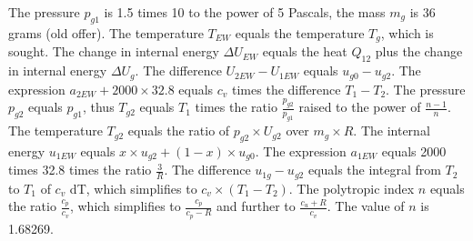 The pressure \( p_{g1} \) is 1.5 times 10 to the power of 5 Pascals, the mass \( m_g \) is 36 grams (old offer).
The temperature \( T_{EW} \) equals the temperature \( T_g \), which is sought.
The change in internal energy \( \Delta U_{EW} \) equals the heat \( Q_{12} \) plus the change in internal energy \( \Delta U_g \).
The difference \( U_{2EW} - U_{1EW} \) equals \( u_{g0} - u_{g2} \).
The expression \( a_{2EW} + 2000 \times 32.8 \) equals \( c_v \) times the difference \( T_1 - T_2 \).
The pressure \( p_{g2} \) equals \( p_{g1} \), thus \( T_{g2} \) equals \( T_1 \) times the ratio \( \frac{p_{g2}}{p_{g1}} \) raised to the power of \( \frac{n-1}{n} \).
The temperature \( T_{g2} \) equals the ratio of \( p_{g2} \times U_{g2} \) over \( m_g \times R \).
The internal energy \( u_{1EW} \) equals \( x \times u_{g2} + (1-x) \times u_{g0} \).
The expression \( a_{1EW} \) equals 2000 times 32.8 times the ratio \( \frac{3}{R} \).
The difference \( u_{1g} - u_{g2} \) equals the integral from \( T_2 \) to \( T_1 \) of \( c_v \) dT, which simplifies to \( c_v \times (T_1 - T_2) \).
The polytropic index \( n \) equals the ratio \( \frac{c_p}{c_v} \), which simplifies to \( \frac{c_p}{c_p - R} \) and further to \( \frac{c_u + R}{c_v} \).
The value of \( n \) is 1.68269.